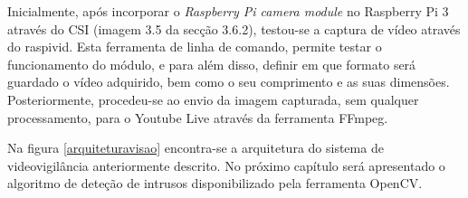 Inicialmente, após incorporar o \textit{Raspberry Pi camera module} no Raspberry Pi 3 através do \ac{CSI} (imagem 3.5 da secção 3.6.2), testou-se a captura de vídeo através do raspivid. Esta ferramenta de linha de comando, permite testar o funcionamento do módulo, e para além disso, definir em que formato será guardado o vídeo adquirido, bem como o seu comprimento e as suas dimensões\cite{raspivid}. Posteriormente, procedeu-se ao envio da imagem capturada, sem qualquer processamento, para o Youtube Live através da ferramenta FFmpeg.


Na figura \ref{arquiteturavisao} encontra-se a arquitetura do sistema de videovigilância anteriormente descrito. No próximo capítulo será apresentado o algoritmo de deteção de intrusos disponibilizado pela ferramenta OpenCV. 




